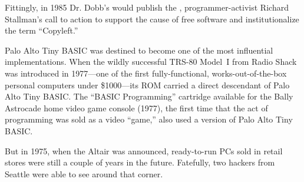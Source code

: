 \begin{tangent}
Fittingly, in 1985 Dr. Dobb's would publish the ,
programmer-activist Richard Stallman's call to action to support the
cause of free software and institutionalize the term ``Copyleft.''
\end{tangent}

Palo Alto Tiny BASIC was destined to become one of the most influential
implementations. 
When the wildly successful TRS-80 Model~I from Radio Shack was
introduced in 1977---one of the first 
fully-functional, works-out-of-the-box  
personal computers under \$1000---its ROM carried a direct descendant of
Palo Alto Tiny BASIC.
The ``BASIC Programming'' cartridge available for the Bally Astrocade
home video game console (1977), the first time that the act of programming
was sold as a video ``game,''
also used a version of Palo Alto Tiny
BASIC.

But in 1975, when the Altair was announced, ready-to-run PCs sold in
retail stores were still a couple of years in the future.
Fatefully, two hackers from Seattle were able to see around that corner.


